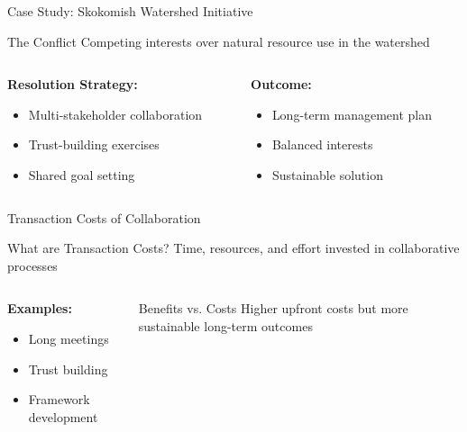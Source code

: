 \documentclass[10pt]{beamer}
\begin{document}
\begin{frame}{Case Study: Skokomish Watershed Initiative}
    \begin{block}{The Conflict}
        Competing interests over natural resource use in the watershed
    \end{block}
    
    \begin{columns}[T]
        \begin{column}{0.5\textwidth}
            \textbf{Resolution Strategy:}
            \begin{itemize}
                \item Multi-stakeholder collaboration
                \item Trust-building exercises
                \item Shared goal setting
            \end{itemize}
        \end{column}
        \begin{column}{0.5\textwidth}
            \textbf{Outcome:}
            \begin{itemize}
                \item Long-term management plan
                \item Balanced interests
                \item Sustainable solution
            \end{itemize}
        \end{column}
    \end{columns}
\end{frame}

\begin{frame}{Transaction Costs of Collaboration}
    \begin{block}{What are Transaction Costs?}
        Time, resources, and effort invested in collaborative processes
    \end{block}
    
    \begin{columns}[T]
        \begin{column}{0.5\textwidth}
            \textbf{Examples:}
            \begin{itemize}
                \item Long meetings
                \item Trust building
                \item Framework development
            \end{itemize}
        \end{column}
        \begin{column}{0.5\textwidth}
            \begin{alertblock}{Benefits vs. Costs}
                Higher upfront costs but more sustainable long-term outcomes
            \end{alertblock}
        \end{column}
    \end{columns}
\end{frame}
\end{document}

